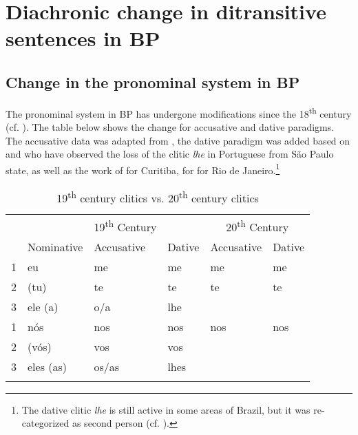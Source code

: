 \documentclass[output=paper,colorlinks,citecolor=brown,modfonts,nonflat]{langsci/langscibook}
\begin{document}
\section{Diachronic change in ditransitive sentences in BP}\label{sec:calindro:2}
\subsection{Change in the pronominal system in BP}
\label{sec:calindro:2.1}
The pronominal system in BP has undergone modifications since the 18\textsuperscript{th} century (cf. \citealt{KatoCyrinoCorrêa2009}). The table below shows the change for accusative and dative paradigms. The accusative data was adapted from \citet[246]{KatoCyrinoCorrêa2009}, the dative paradigm was added based on \citet{Calindro2015} and \citet{TorresMoraisBerlinck2006} who have observed the loss of the clitic \textit{lhe} in Portuguese from São Paulo state, as well as the work of \citet{Berlinck1997} for Curitiba, \citet{Silveira1999} for \citet{Freire2005} for Rio de Janeiro.\footnote{The dative clitic \textit{lhe} is still active in some areas of Brazil, but it was re-categorized as second person (cf. \citealt{FigueiredoSilva2007}).}

\begin{table}
\caption{19\textsuperscript{th} century clitics vs. 20\textsuperscript{th} century clitics}
\label{tab:calindro:1}
\begin{tabularx}{\textwidth}{X llX ll}
\lsptoprule
&  &{ 19\textsuperscript{th} Century} & & \multicolumn{2}{c}{{ 20\textsuperscript{th} Century}}\\
\cmidrule(lr{.1em}){2-4}\cmidrule(lr{.1em}){5-6}
& {{Nominative}} & {{Accusative}} & {{Dative}} & {{Accusative}} & {{Dative}}\\
\midrule
{1}  & eu & me & me & me & me\\
{2}  & (tu) & te & te & te & te\\
{3}  & ele (a) & o/a & lhe & {\longrule} & {\longrule}\\
  \tablevspace
{1}  & nós & nos & nos & nos & nos\\
{2} & (vós) & vos & vos & {\longrule} & {\longrule}\\
{3}  & eles (as) & os/as & lhes & {\longrule} & {\longrule}\\
\lspbottomrule
\end{tabularx}
\end{table}
\end{document}
